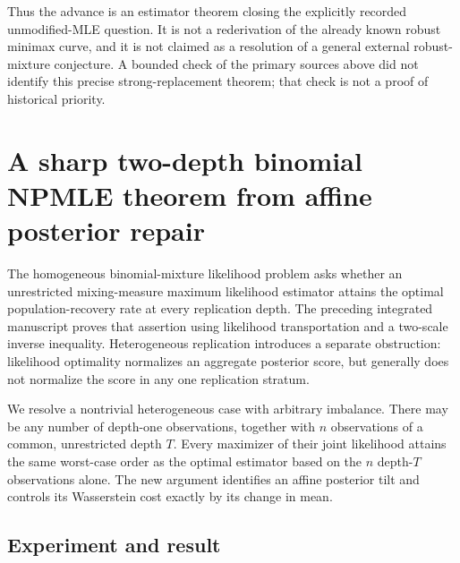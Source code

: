\documentclass[11pt,a4paper]{article}
\theoremstyle{definition}
\theoremstyle{remark}
\numberwithin{equation}{section}
\begin{document}
Thus the advance is an estimator theorem closing the explicitly
recorded unmodified-MLE question.  It is not a rederivation of the
already known robust minimax curve, and it is not claimed as a
resolution of a general external robust-mixture conjecture.  A bounded
check of the primary sources above did not identify this precise
strong-replacement theorem; that check is not a proof of historical
priority.



\section{A sharp two-depth binomial NPMLE theorem from affine posterior repair}
\label{p3:sec:het}

The homogeneous binomial-mixture likelihood problem asks whether an
unrestricted mixing-measure maximum likelihood estimator attains the optimal
population-recovery rate at every replication depth.  The preceding integrated
manuscript proves that assertion using likelihood transportation and a
two-scale inverse inequality.  Heterogeneous replication introduces a separate
obstruction: likelihood optimality normalizes an aggregate posterior score,
but generally does not normalize the score in any one replication stratum.

We resolve a nontrivial heterogeneous case with arbitrary imbalance.  There
may be any number of depth-one observations, together with $n$ observations
of a common, unrestricted depth $T$.  Every maximizer of their joint likelihood
attains the same worst-case order as the optimal estimator based on the $n$
depth-$T$ observations alone.  The new argument identifies an affine posterior
tilt and controls its Wasserstein cost exactly by its change in mean.

\subsection{Experiment and result}
\end{document}
